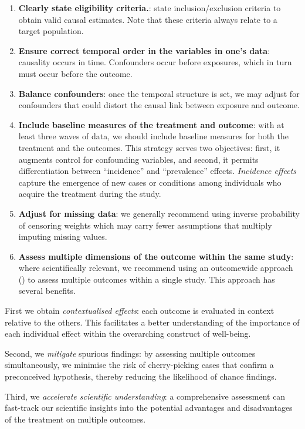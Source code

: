 \documentclass[
  singlecolumn]{article}
\begin{document}
\begin{enumerate}
\def\labelenumi{\arabic{enumi}.}
\setcounter{enumi}{2}
\item
  \textbf{Clearly state eligibility criteria.}: state
  inclusion/exclusion criteria to obtain valid causal estimates. Note
  that these criteria always relate to a target population.
\item
  \textbf{Ensure correct temporal order in the variables in one's data}:
  causality occurs in time. Confounders occur before exposures, which in
  turn must occur before the outcome.
\item
  \textbf{Balance confounders}: once the temporal structure is set, we
  may adjust for confounders that could distort the causal link between
  exposure and outcome.
\item
  \textbf{Include baseline measures of the treatment and outcome}: with
  at least three waves of data, we should include baseline measures for
  both the treatment and the outcomes. This strategy serves two
  objectives: first, it augments control for confounding variables, and
  second, it permits differentiation between ``incidence'' and
  ``prevalence'' effects. \emph{Incidence effects} capture the emergence
  of new cases or conditions among individuals who acquire the treatment
  during the study.
\item
  \textbf{Adjust for missing data}: we generally recommend using inverse
  probability of censoring weights which may carry fewer assumptions
  that multiply imputing missing values.
\item
  \textbf{Assess multiple dimensions of the outcome within the same
  study}: where scientifically relevant, we recommend using an
  outcomewide approach () to assess multiple outcomes within a single
  study. This approach has several benefits.
\end{enumerate}

First we obtain \emph{contextualised effects}: each outcome is evaluated
in context relative to the others. This facilitates a better
understanding of the importance of each individual effect within the
overarching construct of well-being.

Second, we \emph{mitigate} spurious findings: by assessing multiple
outcomes simultaneously, we minimise the risk of cherry-picking cases
that confirm a preconceived hypothesis, thereby reducing the likelihood
of chance findings.

Third, we \emph{accelerate scientific understanding}: a comprehensive
assessment can fast-track our scientific insights into the potential
advantages and disadvantages of the treatment on multiple outcomes.
\end{document}
